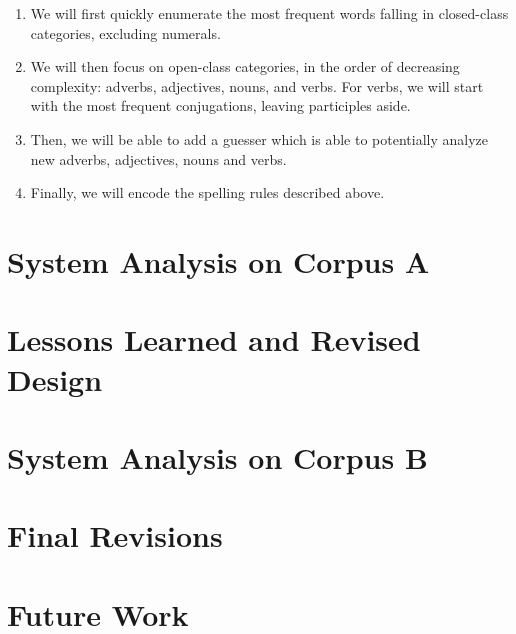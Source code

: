 \documentclass[11pt,letterpaper]{article}
\begin{document}
\begin{enumerate}
  \item We will first quickly enumerate the most frequent words falling in closed-class categories, excluding numerals.
  \item We will then focus on open-class categories, in the order of decreasing complexity: adverbs, adjectives, nouns, and verbs. For verbs, we will start with the most frequent conjugations, leaving participles aside.
  \item Then, we will be able to add a guesser which is able to potentially analyze new adverbs, adjectives, nouns and verbs.
  \item Finally, we will encode the spelling rules described above.
\end{enumerate}

\section{System Analysis on Corpus A}

\section{Lessons Learned and Revised Design}

\section{System Analysis on Corpus B}

\section{Final Revisions}

\section{Future Work}




\label{lastpage}
\end{document}
